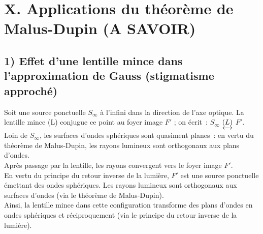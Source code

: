 \documentclass{article}
\begin{document}
\section*{X. Applications du théorème de Malus-Dupin (A SAVOIR)}
\subsection*{1)  Effet d'une lentille mince dans l'approximation de Gauss (stigmatisme
approché)} Soit une source ponctuelle $S_{\mathrm{\infty}}$ à l'infini dans
la direction de l'axe optique. La lentille mince (L) conjugue ce
point au foyer image $F'$ ; on écrit : $S_{\mathrm{\infty}}
$ $\underleftrightarrow{(L)}$ $F'$. \\
Loin de $S_{\mathrm{\infty}}$, les surfaces d'ondes sphériques sont quasiment
planes : en vertu du théorème de Malus-Dupin, les rayons lumineux
sont orthogonaux aux plans d'ondes. \\
Après passage par la lentille, les rayons convergent vers le foyer
image $F'$. \\
En vertu du principe du retour inverse de la lumière,
$F'$ est une source ponctuelle émettant des ondes sphériques. Les
rayons lumineux sont orthogonaux aux surfaces d'ondes (via le
théorème de Malus-Dupin).
\\
Ainsi, la lentille mince dans cette configuration transforme des
plans d'ondes en ondes sphériques et réciproquement (via le principe
du retour inverse de la lumière).
\end{document}
